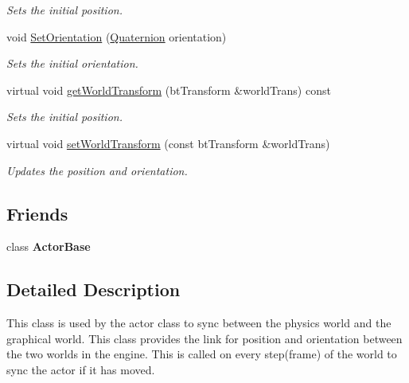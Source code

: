 \begin{DoxyCompactItemize}
\begin{DoxyCompactList}\small\item\em Sets the initial position. \item\end{DoxyCompactList}\item 
void \hyperlink{classphys_1_1PhysMotionState_ac799070edfea4d1c442e3ed0857bcb1d}{SetOrientation} (\hyperlink{classphys_1_1Quaternion}{Quaternion} orientation)
\begin{DoxyCompactList}\small\item\em Sets the initial orientation. \item\end{DoxyCompactList}\item 
virtual void \hyperlink{classphys_1_1PhysMotionState_a80e8549fbab99150ba8f34aa3bf087d8}{getWorldTransform} (btTransform \&worldTrans) const 
\begin{DoxyCompactList}\small\item\em Sets the initial position. \item\end{DoxyCompactList}\item 
virtual void \hyperlink{classphys_1_1PhysMotionState_a91e372f8f474bb570e502ee42ec2deeb}{setWorldTransform} (const btTransform \&worldTrans)
\begin{DoxyCompactList}\small\item\em Updates the position and orientation. \item\end{DoxyCompactList}\end{DoxyCompactItemize}
\subsection*{Friends}
\begin{DoxyCompactItemize}
\item 
\hypertarget{classphys_1_1PhysMotionState_ac09063d4b0192680ba3aa0bd4003a274}{
class {\bfseries ActorBase}}
\label{dc/d0d/classphys_1_1PhysMotionState_ac09063d4b0192680ba3aa0bd4003a274}

\end{DoxyCompactItemize}


\subsection{Detailed Description}
This class is used by the actor class to sync between the physics world and the graphical world. This class provides the link for position and orientation between the two worlds in the engine. This is called on every step(frame) of the world to sync the actor if it has moved. 

